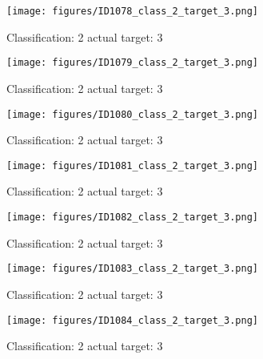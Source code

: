 \begin{figure}[h!]
\begin{center}
\texttt{[image: figures/ID1078\_class\_2\_target\_3.png]}
\end{center}
\caption{ Classification: 2 actual target: 3}
\label{fig:ID1078_class_2_target_3}
\end{figure}
\begin{figure}[h!]
\begin{center}
\texttt{[image: figures/ID1079\_class\_2\_target\_3.png]}
\end{center}
\caption{ Classification: 2 actual target: 3}
\label{fig:ID1079_class_2_target_3}
\end{figure}
\begin{figure}[h!]
\begin{center}
\texttt{[image: figures/ID1080\_class\_2\_target\_3.png]}
\end{center}
\caption{ Classification: 2 actual target: 3}
\label{fig:ID1080_class_2_target_3}
\end{figure}
\begin{figure}[h!]
\begin{center}
\texttt{[image: figures/ID1081\_class\_2\_target\_3.png]}
\end{center}
\caption{ Classification: 2 actual target: 3}
\label{fig:ID1081_class_2_target_3}
\end{figure}
\begin{figure}[h!]
\begin{center}
\texttt{[image: figures/ID1082\_class\_2\_target\_3.png]}
\end{center}
\caption{ Classification: 2 actual target: 3}
\label{fig:ID1082_class_2_target_3}
\end{figure}
\begin{figure}[h!]
\begin{center}
\texttt{[image: figures/ID1083\_class\_2\_target\_3.png]}
\end{center}
\caption{ Classification: 2 actual target: 3}
\label{fig:ID1083_class_2_target_3}
\end{figure}
\begin{figure}[h!]
\begin{center}
\texttt{[image: figures/ID1084\_class\_2\_target\_3.png]}
\end{center}
\caption{ Classification: 2 actual target: 3}
\label{fig:ID1084_class_2_target_3}
\end{figure}
